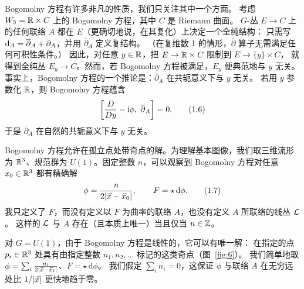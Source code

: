 Bogomolny 方程有许多非凡的性质，我们只关注其中一个方面。
考虑 $W_3=\mathbb{R}\times C$ 上的 Bogomolny 方程，其中 $C$ 是 Riemann 曲面。
$G$-丛 $E\to C$ 上的任何联络 $A$ 都在 $E$（更确切地说，在其复化）上决定一个全纯结构：
只需写 $\mathrm{d}_A=\overline{\partial}_A+\partial_A$，并用 $\overline{\partial}_A$ 定义复结构。
（在复维数 1 的情形，$\overline{\partial}$ 算子无需满足任何可积性条件。）
因此，对任意 $y\in\mathbb{R}$，把 $E\to\mathbb{R}\times C$ 限制到 $E\to\{y\}\times C$，
就得到全纯丛 $E_y\to C$。然而，若 Bogomolny 方程被满足，$E_y$ 便典范地与 $y$ 无关。
事实上，Bogomolny 方程的一个推论是：$\overline{\partial}_A$ 在共轭意义下与 $y$ 无关。
若用 $y$ 参数化 $\mathbb{R}$，则 Bogomolny 方程蕴含
\begin{equation}\stepcounter{equation}
  \left[\frac{D}{Dy}-\mathrm{i}\phi,\;\overline{\partial}_A\right]=0 .
  \tag{1.6}\label{eq:1.6}
\end{equation}
于是 $\overline{\partial}_A$ 在自然的共轭意义下与 $y$ 无关。


Bogomolny 方程允许在孤立点处带奇点的解。为理解基本图像，我们取三维流形为
$\mathbb{R}^3$、规范群为 $U(1)$。固定整数 $n$，可以观察到 Bogomolny 方程对任意
$x_0\in\mathbb{R}^3$ 都有精确解
\begin{equation}\stepcounter{equation}
  \phi=\frac{n}{2|\vx-\vx_0|},\qquad F=\star\,\mathrm{d}\phi .
  \tag{1.7}\label{eq:1.7}
\end{equation}
我只定义了 $F$，而没有定义以 $F$ 为曲率的联络 $A$，也没有定义 $A$ 所联络的线丛 $\mathcal{L}$。
这样的 $\mathcal{L}$ 与 $A$ 存在（且本质上唯一）当且仅当 $n\in\mathbb{Z}$。


对 $G=U(1)$，由于 Bogomolny 方程是线性的，它可以有唯一解：
在指定的点 $p_i\in\mathbb{R}^3$ 处具有由指定整数 $n_1,n_2,\dots$ 标记的这类奇点（图~\ref{fig:6}）。
我们简单地取 $\phi=\sum_i\frac{n_i}{2|\vec{x}-\vec{x}_i|}$、$F=\star\,\mathrm{d}\phi$。
我们假定 $\sum_i n_i=0$，这保证 $\phi$ 与联络 $A$ 在无穷远处比 $1/|\vec{x}|$ 更快地趋于零。


